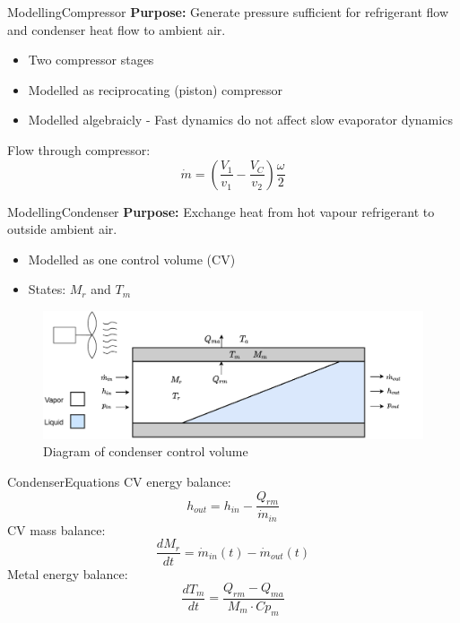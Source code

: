 
\begin{frame}{Modelling}{Compressor}
	\textbf{Purpose:} Generate pressure sufficient for refrigerant flow and condenser heat flow to ambient air.
	\begin{itemize}
		\item Two compressor stages
		\item Modelled as reciprocating (piston) compressor
		\item Modelled algebraicly - Fast dynamics do not affect slow evaporator dynamics
	\end{itemize}
	Flow through compressor:
	\begin{equation}
		\dot{m} = \left(\frac{V_1}{v_1} - \frac{V_C}{v_2}\right) \frac{\omega}{2} \label{eq:comp_mass_flow}
	\end{equation}
\end{frame}


\begin{frame}{Modelling}{Condenser}
	\textbf{Purpose:} Exchange heat from hot vapour refrigerant to outside ambient air.
	\begin{itemize}
		\item Modelled as one control volume (CV)
		\item States: $M_r$ and $T_m$
	\end{itemize}
	\begin{figure}[h!]
		\centering
		\includegraphics[width=1\textwidth]{../Graphics/Condenser.pdf}
		\caption{Diagram of condenser control volume}
		\label{fig:condenser_CV}
	\end{figure}
\end{frame}
\begin{frame}{Condenser}{Equations}
	CV energy balance:
	\begin{equation}
		h_{out} = h_{in} - \frac{Q_{rm}}{\dot{m}_{in}} \label{eq:Condenser_Enthalpy}
	\end{equation}
	CV mass balance:
	\begin{equation}
		\frac{dM_r}{dt} 	 = \dot{m}_{in}(t) - \dot{m}_{out}(t) \label{eq:Condenser_ChangeOfMass}
	\end{equation}
	Metal energy balance:
	\begin{equation}
		\frac{dT_m}{dt} 	 = \frac{Q_{rm} - Q_{ma}}{M_m \cdot Cp_m} \label{eq:Condenser_ChangeOfTemperature}
	\end{equation}
\end{frame}




